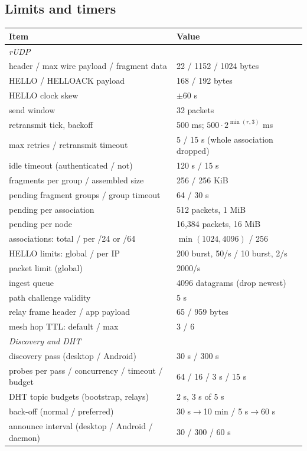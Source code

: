\documentclass[11pt,a4paper]{article}
\DeclareRobustCommand{\_}{\origunderscore\allowbreak}
\begin{document}
\subsection{Limits and timers}
\begin{longtable}{p{}p{}}
\toprule
Item & Value\\
\midrule\endhead
\multicolumn{2}{l}{\emph{rUDP}}\\
header / max wire payload / fragment data & 22 / 1152 / 1024 bytes\\
HELLO / HELLO\_ACK payload & 168 / 192 bytes\\
HELLO clock skew & $\pm$60 s\\
send window & 32 packets\\
retransmit tick, backoff & 500 ms; $500 \cdot 2^{\min(r,3)}$ ms\\
max retries / retransmit timeout & 5 / 15 s (whole association dropped)\\
idle timeout (authenticated / not) & 120 s / 15 s\\
fragments per group / assembled size & 256 / 256 KiB\\
pending fragment groups / group timeout & 64 / 30 s\\
pending per association & 512 packets, 1 MiB\\
pending per node & 16{,}384 packets, 16 MiB\\
associations: total / per /24 or /64 & $\min(1024, 4096)$ / 256\\
HELLO limits: global / per IP & 200 burst, 50/s / 10 burst, 2/s\\
packet limit (global) & 2000/s\\
ingest queue & 4096 datagrams (drop newest)\\
path challenge validity & 5 s\\
relay frame header / app payload & 65 / 959 bytes\\
mesh hop TTL: default / max & 3 / 6\\
\multicolumn{2}{l}{\emph{Discovery and DHT}}\\
discovery pass (desktop / Android) & 30 s / 300 s\\
probes per pass / concurrency / timeout / budget & 64 / 16 / 3 s / 15 s\\
DHT topic budgets (bootstrap, relays) & 2 s, 3 s of 5 s\\
back-off (normal / preferred) & 30 s$\to$10 min / 5 s$\to$60 s\\
announce interval (desktop / Android / daemon) & 30 / 300 / 60 s\\

\end{longtable}
\end{document}
